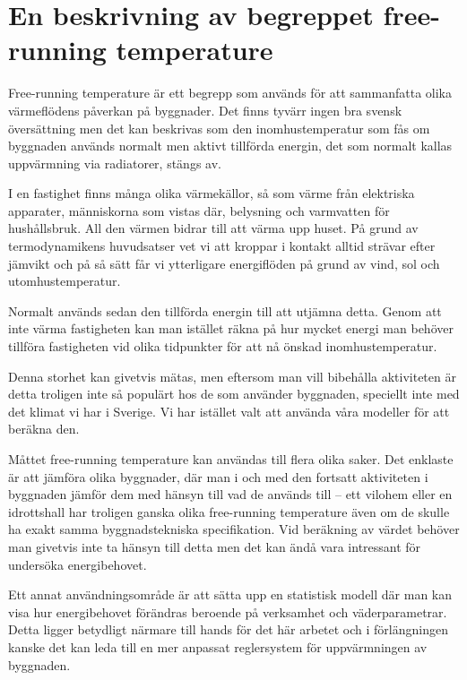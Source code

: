\section{En beskrivning av begreppet free-running temperature}
\label{sec:freerunningtemp}

Free-running temperature är ett begrepp som används för att sammanfatta olika 
värmeflödens påverkan på byggnader. Det finns tyvärr ingen bra svensk översättning 
men det kan beskrivas som den inomhustemperatur som fås om byggnaden används 
normalt men aktivt tillförda energin, det som normalt kallas uppvärmning via radiatorer, 
stängs av.

I en fastighet finns många olika värmekällor, så som värme från elektriska apparater, 
människorna som vistas där, belysning och varmvatten för hushållsbruk. All den värmen
 bidrar till att värma upp huset. På grund av termodynamikens huvudsatser vet vi att 
 kroppar i kontakt alltid strävar efter jämvikt och på så sätt får vi ytterligare energiflöden på 
 grund av vind, sol och utomhustemperatur.

Normalt används sedan den tillförda energin till att utjämna detta. Genom att inte värma 
fastigheten kan man istället räkna på hur mycket energi man behöver tillföra fastigheten 
vid olika tidpunkter för att nå önskad inomhustemperatur.

Denna storhet kan givetvis mätas, men eftersom man vill bibehålla aktiviteten är detta troligen inte så populärt hos de som använder byggnaden, speciellt inte med det klimat vi har i Sverige. Vi har istället valt att använda våra modeller för att beräkna den.

Måttet free-running temperature kan användas till flera olika saker. Det enklaste är att 
jämföra olika byggnader, där man i och med den fortsatt aktiviteten i byggnaden jämför
 dem med hänsyn till vad de används till – ett vilohem eller en idrottshall har troligen 
 ganska olika free-running temperature även om de skulle ha exakt samma 
 byggnadstekniska specifikation. Vid beräkning av värdet behöver man givetvis inte ta 
 hänsyn till detta men det kan ändå vara intressant för undersöka energibehovet.

Ett annat användningsområde är att sätta upp en statistisk modell där man kan visa hur 
energibehovet förändras beroende på verksamhet och väderparametrar. Detta ligger 
betydligt närmare till hands för det här arbetet och i förlängningen kanske det kan leda till 
en mer anpassat reglersystem för uppvärmningen av byggnaden.
